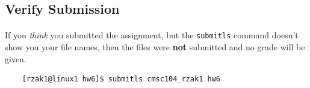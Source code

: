 \documentclass[letter,11pt]{article}
\begin{document}
\subsection*{Verify Submission}
\paragraph{}If you \textit{think} you submitted the assignment, but the \texttt{submitls} command doesn't show you your file names, then the files were \textbf{not} submitted and no grade will be given.
\begin{verbatim}
    [rzak1@linux1 hw6]$ submitls cmsc104_rzak1 hw6
\end{verbatim}
\end{document}
